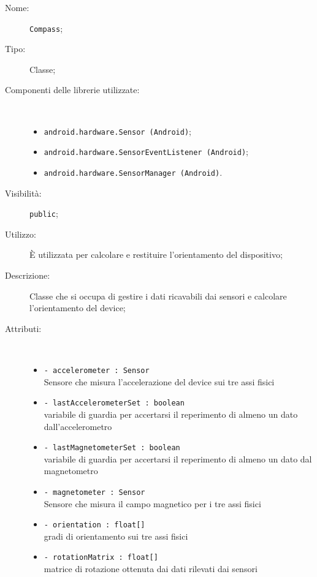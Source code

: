 \documentclass[../DefinizioneDiProdotto.tex]{subfiles}
\begin{document}
    \begin{description}
\item[Nome:] \texttt{Compass};
\item[Tipo:] Classe;
\item[Componenti delle librerie utilizzate:] \
\begin{itemize}
\item \texttt{android.hardware.Sensor (Android)};

\item \texttt{android.hardware.SensorEventListener (Android)};

\item \texttt{android.hardware.SensorManager (Android)}.

\end{itemize}
\item[Visibilità:] \texttt{public};
\item[Utilizzo:] È utilizzata per calcolare e restituire l'orientamento del dispositivo;
\item[Descrizione:] Classe che si occupa di gestire i dati ricavabili dai sensori e calcolare l'orientamento del device;
\item[Attributi:] \
\begin{itemize}
\item \texttt{- accelerometer : Sensor}\\
Sensore che misura l'accelerazione del device sui tre assi fisici

\item \texttt{- lastAccelerometerSet : boolean}\\
variabile di guardia per accertarsi il reperimento di almeno un dato dall'accelerometro

\item \texttt{- lastMagnetometerSet : boolean}\\
variabile di guardia per accertarsi il reperimento di almeno un dato dal magnetometro

\item \texttt{- magnetometer : Sensor}\\
Sensore che misura il campo magnetico per i tre assi fisici

\item \texttt{- orientation : float[]}\\
gradi di orientamento sui tre assi fisici

\item \texttt{- rotationMatrix : float[]}\\
matrice di rotazione ottenuta dai dati rilevati dai sensori


\end{itemize}
\end{description}
\end{document}
